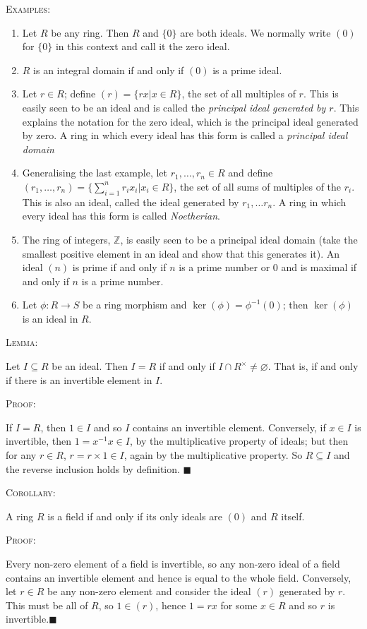 \documentclass[12pt,a4paper]{article}
\newcommand{\proof}{\noindent\textsc{\large Proof:}\par}
\newcommand{\lemma}[1]{\noindent\textsc{\large Lemma:}  \textit{\large #1}\par}
\newcommand{\corol}[1]{\noindent\textsc{\large Corollary:}  \textit{\large #1}\par}
\newcommand{\example}[1]{\noindent\textsc{\large Examples:}  \textit{\large #1}\par}
\newcommand{\qed}{\hfill$\blacksquare$\gap}
\newcommand{\gap}{\par \vspace{5mm}}
\begin{document}
\example{}
\begin{enumerate}
\item Let $R$ be any ring. Then $R$ and $\{0\}$ are both ideals. We normally write $(0)$ for $\{0\}$ in this context and call it the zero ideal.
\item $R$ is an integral domain if and only if $(0)$ is a prime ideal.
\item Let $r\in R$; define $(r)=\{rx | x\in R\}$, the set of all multiples of $r$. This is easily seen to be an ideal and is called the \textit{principal ideal generated by $r$}. This explains the notation for the zero ideal, which is the principal ideal generated by zero. A ring in which every ideal has this form is called a \textit{principal ideal domain}
\item Generalising the last example, let $r_1,\hdots,r_n\in R$ and define $(r_1,\hdots,r_n)=\{\sum_{i=1}^n r_ix_i | x_i\in R\}$, the set of all sums of multiples of the $r_i$. This is also an ideal, called the ideal generated by $r_1,\hdots r_n$. A ring in which every ideal has this form is called \textit{Noetherian}.
\item The ring of integers, $\mathbb{Z}$, is easily seen to be a principal ideal domain (take the smallest positive element in an ideal and show that this generates it). An ideal $(n)$ is prime if and only if $n$ is a prime number or 0 and is maximal if and only if $n$ is a prime number.
\item Let $\phi:R\to S$ be a ring morphism and $\ker(\phi)=\phi^{-1}(0)$; then $\ker(\phi)$ is an ideal in $R$.
\end{enumerate}

\lemma{}
Let $I\subseteq R$ be an ideal. Then $I=R$ if and only if $I\cap R^\times \neq \varnothing$. That is, if and only if there is an invertible element in $I$.\gap

\proof
If $I=R$, then $1\in I$ and so $I$ contains an invertible element. Conversely, if $x\in I$ is invertible, then $1=x^{-1}x\in I$, by the multiplicative property of ideals; but then for any $r\in R$, $r=r\times 1\in I$, again by the multiplicative property. So $R\subseteq I$ and the reverse inclusion holds by definition. \qed

\corol{}
A ring $R$ is a field if and only if its only ideals are $(0)$ and $R$ itself.\gap

\proof
Every non-zero element of a field is invertible, so any non-zero ideal of a field contains an invertible element and hence is equal to the whole field. Conversely, let $r\in R$ be any non-zero element and consider the ideal $(r)$ generated by $r$. This must be all of $R$, so $1\in (r)$, hence $1=rx$ for some $x\in R$ and so $r$ is invertible.\qed
\end{document}
